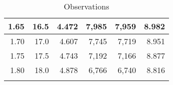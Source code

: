 \begin{longtable}{|r|r|r|r|r|r|}
			1.65                                                                                                   & 16.5                                                                                                  & 4.472                                                                                          & 7,985                                              & 7,959                                                     & 8.982                                             \\ \hline
			1.70                                                                                                   & 17.0                                                                                                  & 4.607                                                                                          & 7,745                                              & 7,719                                                     & 8.951                                             \\ \hline
			1.75                                                                                                   & 17.5                                                                                                  & 4.743                                                                                          & 7,192                                              & 7,166                                                     & 8.877                                             \\ \hline
			1.80                                                                                                   & 18.0                                                                                                  & 4.878                                                                                          & 6,766                                              & 6,740                                                     & 8.816                                             \\ \hline
		\caption{Observations}
		\label{tab:mass-abs-coeff}
		\end{longtable}
%
%
